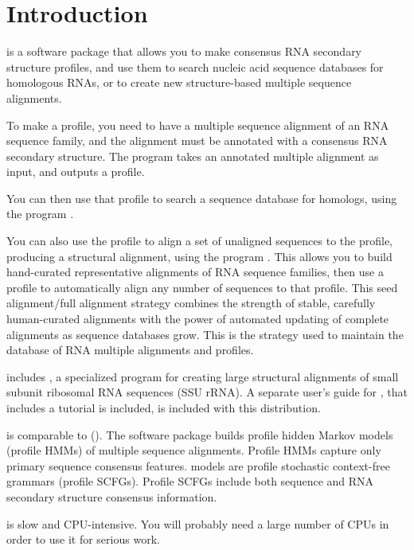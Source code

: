 \section{Introduction}

 is a software package that allows you to make
consensus RNA secondary structure profiles, and use them to search
nucleic acid sequence databases for homologous RNAs, or to create new
structure-based multiple sequence alignments.

To make a profile, you need to have a multiple sequence alignment of
an RNA sequence family, and the alignment must be annotated with a
consensus RNA secondary structure. The program  takes an
annotated multiple alignment as input, and outputs a profile.

You can then use that profile to search a sequence database for homologs,
using the program .

You can also use the profile to align a set of unaligned sequences to
the profile, producing a structural alignment, using the program
. This allows you to build hand-curated representative
alignments of RNA sequence families, then use a profile to
automatically align any number of sequences to that profile.  This
seed alignment/full alignment strategy combines the strength of
stable, carefully human-curated alignments with the power of automated
updating of complete alignments as sequence databases grow. This is
the strategy used to maintain the  database of RNA
multiple alignments and profiles.

 includes , a specialized program for
creating large structural alignments of small subunit ribosomal RNA
sequences (SSU rRNA). A separate user's guide for ,
that includes a tutorial is included, is included with this
distribution.

 is comparable to 
().
The  software package builds profile hidden Markov
models (profile HMMs) of multiple sequence alignments. Profile HMMs
capture only primary sequence consensus features. 
models are profile stochastic context-free grammars (profile SCFGs).
Profile SCFGs include both sequence and RNA secondary structure
consensus information.

 is slow and CPU-intensive. You will probably need
a large number of CPUs in order to use it for serious work. 














